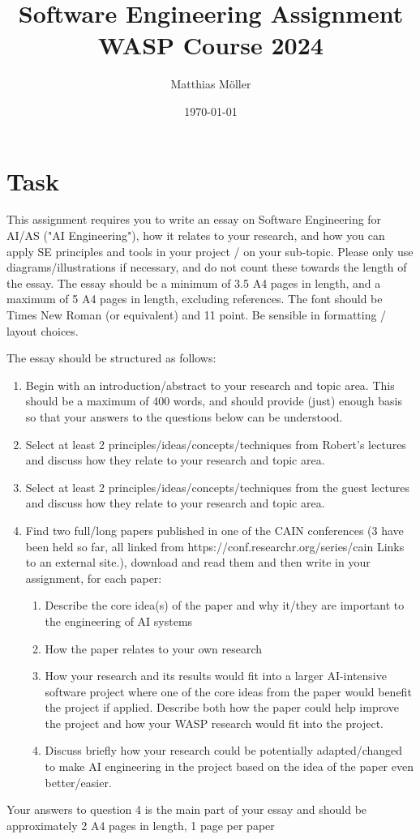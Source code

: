 \documentclass[11pt]{article}
\title{Software Engineering Assignment\\
  WASP Course 2024
}
\author{Matthias Möller}
\date{\today}
\begin{document}
\maketitle  

\section*{Task}

{
  \setlength{\parindent}{0pt}
  \scriptsize

This assignment requires you to write an essay on Software Engineering for AI/AS ("AI Engineering"), how it relates to your research, and how you can apply SE principles and tools in your project / on your sub-topic. Please only use diagrams/illustrations if necessary, and do not count these towards the length of the essay. The essay should be a minimum of 3.5 A4 pages in length, and a maximum of 5 A4 pages in length, excluding references. The font should be Times New Roman (or equivalent) and 11 point. Be sensible in formatting / layout choices.

The essay should be structured as follows:

\begin{enumerate}
  \setlength{\itemsep}{0pt}
\item Begin with an introduction/abstract to your research and topic area. This should be a maximum of 400 words, and should provide (just) enough basis so that your answers to the questions below can be understood.
\item Select at least 2 principles/ideas/concepts/techniques from Robert's lectures and discuss how they relate to your research and topic area.
\item Select at least 2 principles/ideas/concepts/techniques from the guest lectures and discuss how they relate to your research and topic area.
\item Find two full/long papers published in one of the CAIN conferences (3 have been held so far, all linked from https://conf.researchr.org/series/cain Links to an external site.), download and read them and then write in your assignment, for each paper:
  \begin{enumerate}
  \item Describe the core idea(s) of the paper and why it/they are important to the engineering of AI systems
  \item How the paper relates to your own research
  \item How your research and its results would fit into a larger AI-intensive software project where one of the core ideas from the paper would benefit the project if applied. Describe both how the paper could help improve the project and how your WASP research would fit into the project.
  \item Discuss briefly how your research could be potentially adapted/changed to make AI engineering in the project based on the idea of the paper even better/easier.
  \end{enumerate}
\end{enumerate}

Your answers to question 4 is the main part of your essay and should be approximately 2 A4 pages in length, 1 page per paper
}
\end{document}
